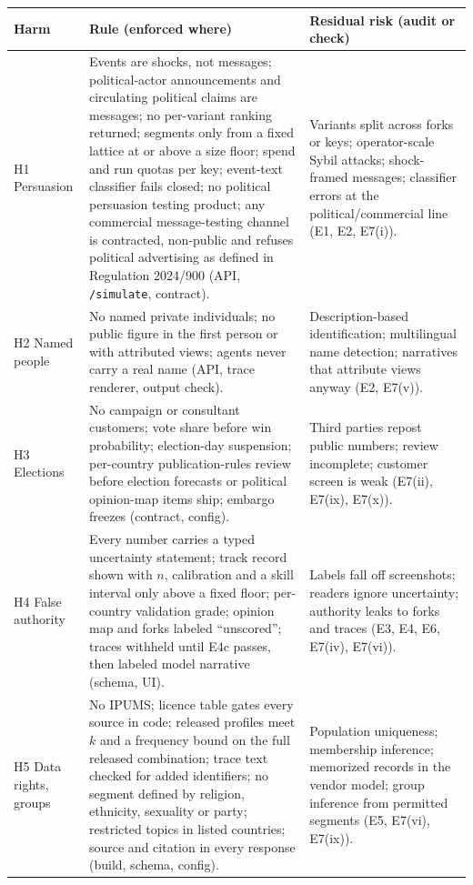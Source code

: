\documentclass[11pt]{article}
\begin{document}
\begin{table}[htbp]
\centering
\footnotesize
\begin{tabular}{@{}L{1.6cm}L{6.2cm}L{4.0cm}@{}}
\toprule
Harm & Rule (enforced where) & Residual risk (audit or check) \\
\midrule
H1 Persuasion & Events are shocks, not messages; political-actor announcements and circulating political claims are messages; no per-variant ranking returned; segments only from a fixed lattice at or above a size floor; spend and run quotas per key; event-text classifier fails closed; no political persuasion testing product; any commercial message-testing channel is contracted, non-public and refuses political advertising as defined in Regulation 2024/900 (API, \texttt{/simulate}, contract). & Variants split across forks or keys; operator-scale Sybil attacks; shock-framed messages; classifier errors at the political/commercial line (E1, E2, E7(i)). \\
H2 Named people & No named private individuals; no public figure in the first person or with attributed views; agents never carry a real name (API, trace renderer, output check). & Description-based identification; multilingual name detection; narratives that attribute views anyway (E2, E7(v)). \\
H3 Elections & No campaign or consultant customers; vote share before win probability; election-day suspension; per-country publication-rules review before election forecasts or political opinion-map items ship; embargo freezes (contract, config). & Third parties repost public numbers; review incomplete; customer screen is weak (E7(ii), E7(ix), E7(x)). \\
H4 False authority & Every number carries a typed uncertainty statement; track record shown with $n$, calibration and a skill interval only above a fixed floor; per-country validation grade; opinion map and forks labeled ``unscored''; traces withheld until E4c passes, then labeled model narrative (schema, UI). & Labels fall off screenshots; readers ignore uncertainty; authority leaks to forks and traces (E3, E4, E6, E7(iv), E7(vi)). \\
H5 Data rights, groups & No IPUMS; licence table gates every source in code; released profiles meet $k$ and a frequency bound on the full released combination; trace text checked for added identifiers; no segment defined by religion, ethnicity, sexuality or party; restricted topics in listed countries; source and citation in every response (build, schema, config). & Population uniqueness; membership inference; memorized records in the vendor model; group inference from permitted segments (E5, E7(vi), E7(ix)). \\

\end{tabular}
\end{table}
\end{document}
